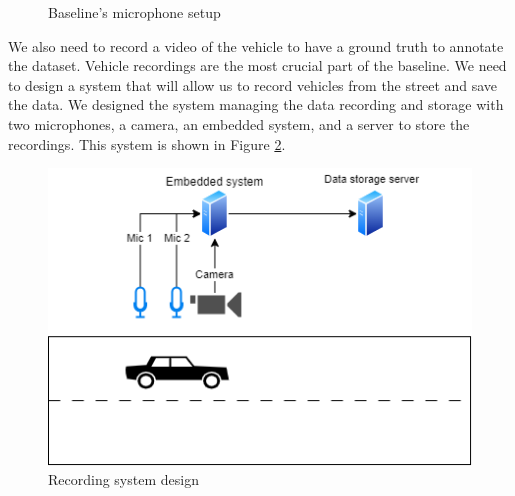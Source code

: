 \begin{figure}[H]
    \centering
    \qquad
    \caption{Baseline's microphone setup}
    \label{fig:baseline_setup}
\end{figure}

We also need to record a video of the vehicle to have a ground truth to annotate the dataset. Vehicle recordings are the most crucial part of the baseline. We need to design a system that will allow us to record vehicles from the street and save the data. We designed the system managing the data recording and storage with two microphones, a camera, an embedded system, and a server to store the recordings. This system is shown in Figure \ref{fig:recording_system_design.drawio}.

\begin{figure}[H]
    \centering
    \includegraphics[width=.8\textwidth]{../Images/recording_system_design.drawio.png}
    \caption{Recording system design}
    \label{fig:recording_system_design.drawio}
\end{figure}

